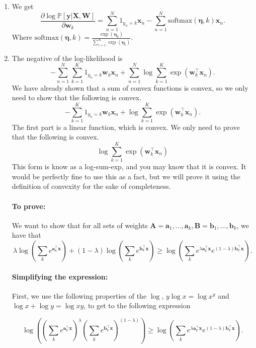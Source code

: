 \documentclass{../../tex_import/ETHuebung_english_theory}
\begin{document}
\begin{enumerate}
	\item We get
	\[	
	\frac{\partial \log \mathbb{P}[\mathbf{y} | \mathbf{X}, \mathbf{W}]}
	{\partial \mathbf{w}_k} =
	\sum_{n=1}^N 1_{y_n = k}\mathbf{x}_n - \sum_{n=1}^N \text{softmax}(\mathbf{\eta}, k)\mathbf{x}_n.
	\]
	Where $\text{softmax}(\mathbf{\eta}, k) = \frac{\exp(\mathbf{\eta}_k)}{\sum_{i=1}^K \exp(\mathbf{\eta}_i)}$.
	
	\item The negative of the log-likelihood is
	\[	- \sum_{n=1}^N \sum_{k=1}^K 1_{y_n = k} \mathbf{w}_k\mathbf{x}_n + \sum_{n=1}^N \log \sum_{k=1}^K \exp(\mathbf{w}_k^\top\mathbf{x}_n).	\]
	We have already shown that a sum of convex functions is convex, so we only need to show that the following is convex.
	\[	- \sum_{k=1}^K 1_{y_n = k} \mathbf{w}_k\mathbf{x}_n + \log \sum_{k=1}^K \exp(\mathbf{w}_k^\top\mathbf{x}_n).	\]
	The first part is a linear function, which is convex. We only need to prove that the following is convex.
	\[	\log \sum_{k=1}^K \exp(\mathbf{w}_k^\top\mathbf{x}_n)	\]
	This form is know as a log-sum-exp, and you may know that it is convex. It would be perfectly fine to use this as a fact, but we will prove it using the definition of convexity for the sake of completeness.
	
	\paragraph{To prove:}
	We want to show that for all sets of weights $\mathbf{A} = \mathbf{a}_1, ..., \mathbf{a}_k, \mathbf{B} = \mathbf{b}_1, ..., \mathbf{b}_k$, we have that	
	\[
	\lambda \log \left( \sum_k e^{\mathbf{a}_k^\top\mathbf{x}}\right)
	+
	(1 - \lambda) \log \left( \sum_k e^{\mathbf{b}_k^\top\mathbf{x}}\right)
	\geq
	\log \left( \sum_k e^{\lambda\mathbf{a}_k^\top\mathbf{x}}e^{(1-\lambda)\mathbf{b}_k^\top\mathbf{x}} \right).
	\]
	\paragraph{Simplifying the expression:}
	First, we use the following properties of the $\log$, $y \log x = \log x^y$ and $\log x + \log y = \log x y$, to get to the following expression 

	\[
	\log \left( \left(\sum_k e^{\mathbf{a}_k^\top\mathbf{x}}\right)^\lambda
	\left(\sum_k e^{\mathbf{b}_k^\top\mathbf{x}}\right)^{(1 - \lambda)}\right)
	\geq
	\log \left( \sum_k e^{\lambda\mathbf{a}_k^\top\mathbf{x}}e^{(1-\lambda)\mathbf{b}_k^\top\mathbf{x}} \right).
	\]

\end{enumerate}
\end{document}
